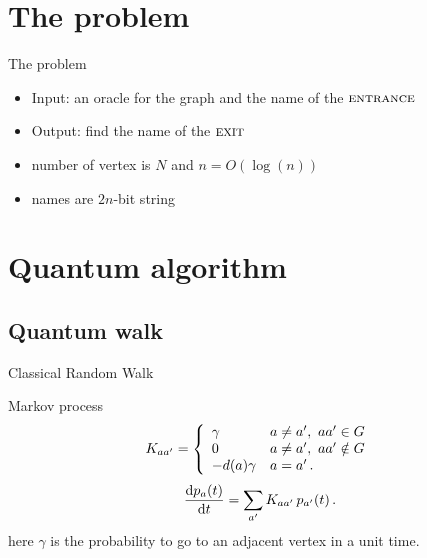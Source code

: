\documentclass{beamer}
\makeatletter
\newcommand{\<}{\langle}
\renewcommand{\>}{\rangle}
\newcommand{\be}{\begin{equation}}
\newcommand{\ee}{\end{equation}}
\newcommand{\cond}[1]{\left\{\begin{array}{l@{~~~}l}#1\end{array}\right.}
\newcommand{\ent}{{\textsc{entrance}}}
\newcommand{\exit}{{\textsc{exit}}}
\renewcommand{\d}{{\mathrm{d}}}
\makeatother
\begin{document}

\section{The problem}\label{sec:problem}

\begin{frame}{The problem}
    \begin{block}{}
        \begin{itemize}
            \item Input: an oracle for the graph and the name of the $\ent$
            \item Output: find the name of the $\exit$
        \end{itemize}
    \end{block}
    
    \begin{exampleblock}{}
        \begin{itemize}
            \item number of vertex is $N$ and $n=O(\log(n))$
            \item names are $2n$-bit string
        \end{itemize}
    \end{exampleblock}
    
\end{frame}





\section{Quantum algorithm}\label{sec:algorithm}

\subsection{Quantum walk}\label{subsec:qwalk}

\begin{frame}{Classical Random Walk}
\begin{block}{Markov process}
    \be
      K_{aa'} = \cond{ 
          \gamma       & a \ne a', \ aa' \in G \\
          0            & a \ne a', \ aa' \notin G \\
          -d(a) \gamma & a=a' \,.}
    \ee
    \be
      {\d p_a(t) \over \d t} = \sum_{a'} K_{aa'} \, p_{a'}(t)
    \,.
    \label{eq:diffeq}
    \ee
here $\gamma$ is the probability to go to an adjacent vertex in a unit time.
\end{block}
\end{frame}
\end{document}
